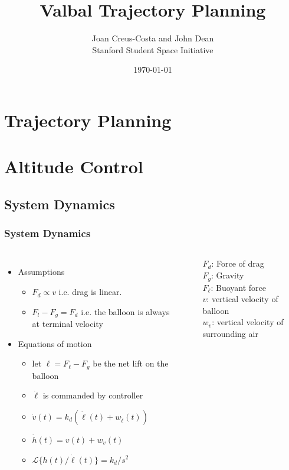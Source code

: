 \documentclass[10pt,mathserif]{beamer}
\title{\large \bfseries Valbal Trajectory Planning}
\author{Joan Creus-Costa and John Dean\\[3ex]
\small Stanford Student Space Initiative}
\date{\today}
\begin{document}
\frame{
\thispagestyle{empty}
\titlepage
}


\section{Trajectory Planning}



\section{Altitude Control}
\subsection{System Dynamics}

\begin{frame}
\frametitle{System Dynamics}
\begin{columns}
\begin{itemize}\itemsep=12pt
\item Assumptions
\vspace*{0.5em}
\begin{itemize}
\item $F_d \propto v$ i.e. drag is linear.
\item $F_l - F_g = F_d$ i.e. the balloon is always at terminal velocity 
\end{itemize}
\item Equations of motion
\vspace*{0.5em}
\begin{itemize}
\item let $\ell = F_{\ell} - F_g$ be the net lift on the balloon
\item $\dot \ell$ is commanded by controller
\item $\dot v(t) = k_d (\dot \ell(t) + w_{\dot \ell} (t))$
\item $\dot h(t) = v(t) +  w_v(t)$
\item $\mathcal{L}\{h(t) / \dot \ell (t) \} = k_{d} / s^2$
\end{itemize}
\end{itemize}


\begin{center}
\end{center}
$F_d$: Force of drag\\
$F_g$: Gravity\\
$F_{\ell}$: Buoyant force\\
$v$: vertical velocity of balloon\\
$w_v$: vertical velocity of surrounding air
\end{columns}
\end{frame}
\end{document}

